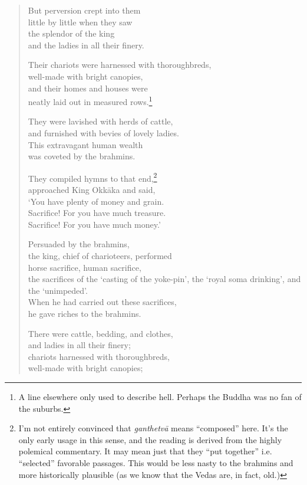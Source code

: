 \documentclass[12pt,openany]{book}%
\begin{document}
\begin{verse}
But perversion crept into them \\
little by little when they saw \\
the splendor of the king \\
and the ladies in all their finery. 

Their chariots were harnessed with thoroughbreds, \\
well-made with bright canopies, \\
and their homes and houses were \\
neatly laid out in measured rows.\footnote{A line elsewhere only used to describe hell. Perhaps the Buddha was no fan of the suburbs. } 

They were lavished with herds of cattle, \\
and furnished with bevies of lovely ladies. \\
This extravagant human wealth \\
was coveted by the brahmins. 

They compiled hymns to that end,\footnote{I’m not entirely convinced that \textit{\textsanskrit{ganthetvā}} means “composed” here. It’s the only early usage in this sense, and the reading is derived from the highly polemical commentary. It may mean just that they “put together” i.e. “selected” favorable passages. This would be less nasty to the brahmins and more historically plausible (as we know that the Vedas are, in fact, old.) } \\
approached King \textsanskrit{Okkāka} and said, \\
‘You have plenty of money and grain. \\
Sacrifice! For you have much treasure. \\
Sacrifice! For you have much money.’ 

Persuaded by the brahmins, \\
the king, chief of charioteers, performed \\
horse sacrifice, human sacrifice, \\
the sacrifices of the ‘casting of the yoke-pin’, the ‘royal soma drinking’, and the ‘unimpeded’. \\
When he had carried out these sacrifices, \\
he gave riches to the brahmins. 

There were cattle, bedding, and clothes, \\
and ladies in all their finery; \\
chariots harnessed with thoroughbreds, \\
well-made with bright canopies; 


\end{verse}
\end{document}
